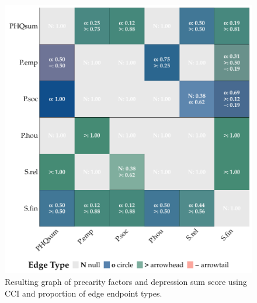 \documentclass[
]{article}
\begin{document}
\begin{figure}
\begin{minipage}{0.50\linewidth}
{\includegraphics[width=1\textwidth,height=\textheight]{img/depsum_mat_cci.pdf}

}


\end{minipage}%

\caption{\label{fig-sum-cci}Resulting graph of precarity factors and
depression sum score using CCI and proportion of edge endpoint types.}

\end{figure}%
\end{document}
